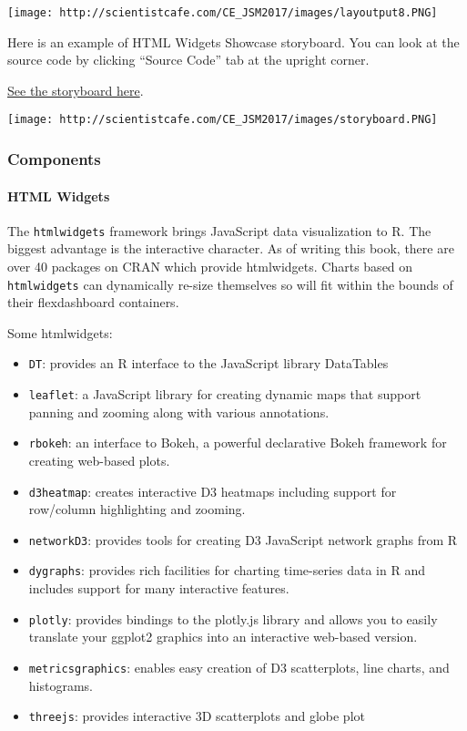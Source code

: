 \documentclass[
]{article}
\providecommand{\tightlist}{%
  \setlength{\itemsep}{0pt}\setlength{\parskip}{0pt}}
\begin{document}
\texttt{[image: http://scientistcafe.com/CE\_JSM2017/images/layoutput8.PNG]}

Here is an example of HTML Widgets Showcase storyboard. You can look at
the source code by clicking ``Source Code'' tab at the upright corner.

\href{http://scientistcafe.com/CE_JSM2017/Examples/storyboard.html}{See
the storyboard here}.

\texttt{[image: http://scientistcafe.com/CE\_JSM2017/images/storyboard.PNG]}

\hypertarget{components}{%
\subsubsection{Components}\label{components}}

\hypertarget{html-widgets}{%
\paragraph{HTML Widgets}\label{html-widgets}}

The \texttt{htmlwidgets} framework brings JavaScript data visualization
to R. The biggest advantage is the interactive character. As of writing
this book, there are over 40 packages on CRAN which provide htmlwidgets.
Charts based on \texttt{htmlwidgets} can dynamically re-size themselves
so will fit within the bounds of their flexdashboard containers.

Some htmlwidgets:

\begin{itemize}
\tightlist
\item
  \texttt{DT}: provides an R interface to the JavaScript library
  DataTables
\item
  \texttt{leaflet}: a JavaScript library for creating dynamic maps that
  support panning and zooming along with various annotations.
\item
  \texttt{rbokeh}: an interface to Bokeh, a powerful declarative Bokeh
  framework for creating web-based plots.
\item
  \texttt{d3heatmap}: creates interactive D3 heatmaps including support
  for row/column highlighting and zooming.
\item
  \texttt{networkD3}: provides tools for creating D3 JavaScript network
  graphs from R
\item
  \texttt{dygraphs}: provides rich facilities for charting time-series
  data in R and includes support for many interactive features.
\item
  \texttt{plotly}: provides bindings to the plotly.js library and allows
  you to easily translate your ggplot2 graphics into an interactive
  web-based version.
\item
  \texttt{metricsgraphics}: enables easy creation of D3 scatterplots,
  line charts, and histograms.
\item
  \texttt{threejs}: provides interactive 3D scatterplots and globe plot
\end{itemize}
\end{document}
